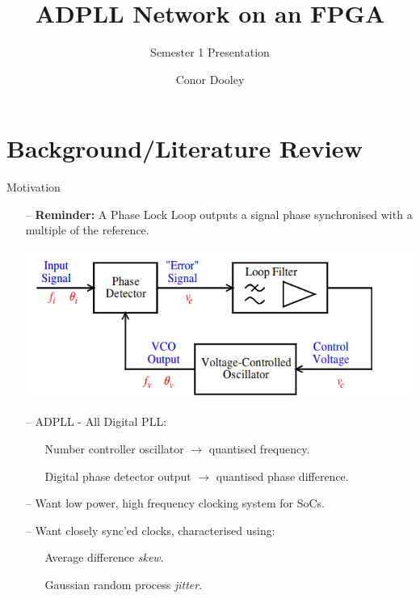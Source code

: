 \documentclass{beamer}
\title{ADPLL Network on an FPGA}
\author{Conor Dooley}
\subtitle{Semester 1 Presentation}
\begin{document}
\begin{frame}
    \titlepage
\end{frame}

\section*{Background/Literature Review}
\begin{frame}{Motivation}
	\begin{itemize}
        \item[--]
            \textbf{Reminder:} A Phase Lock Loop outputs a signal phase synchronised with a multiple of the reference.
            \begin{center}
            \includegraphics[scale=0.3]{mulkeen_pll}
            \begin{tiny}\begin{flushright}\cite{bm_slides}\end{flushright}\end{tiny}
            \end{center}
        \item[--]
            ADPLL - All Digital PLL:
            \begin{itemize}
	        \item[]
	            Number controller oscillator $\rightarrow$ quantised frequency.
	        \item[]
	            Digital phase detector output $\rightarrow$ quantised phase difference.
        	\end{itemize}
        \end{itemize}
    \begin{itemize}
        \item[--]
        	Want low power, high frequency clocking system for SoCs.
        \item[--]
            Want closely sync'ed clocks, characterised using:
    		\begin{itemize}
    			\item[]
    				Average difference \textit{skew}.
    			\item[]
	    			Gaussian random process \textit{jitter}.
    		\end{itemize}
    \end{itemize}
\end{frame}
\end{document}
